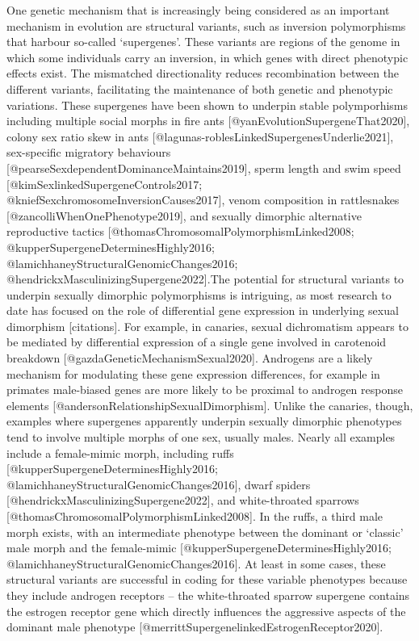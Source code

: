 \documentclass[
  11pt,
]{article}
\begin{document}
One genetic mechanism that is increasingly being considered as an important
mechanism in evolution are structural variants, such as inversion
polymorphisms that harbour so-called `supergenes'. These variants are
regions of the genome in which some individuals carry an inversion, in
which genes with direct phenotypic effects exist. The mismatched
directionality reduces recombination between the different variants,
facilitating the maintenance of both genetic and phenotypic variations.
These supergenes have been shown to underpin stable polymporhisms
including multiple social morphs in fire ants
{[}@yanEvolutionSupergeneThat2020{]}, colony sex ratio skew in ants
{[}@lagunas-roblesLinkedSupergenesUnderlie2021{]}, sex-specific migratory behaviours {[}@pearseSexdependentDominanceMaintains2019{]}, sperm length and swim speed {[}@kimSexlinkedSupergeneControls2017; @kniefSexchromosomeInversionCauses2017{]}, venom composition in rattlesnakes
{[}@zancolliWhenOnePhenotype2019{]}, and sexually dimorphic alternative
reproductive tactics {[}@thomasChromosomalPolymorphismLinked2008;
@kupperSupergeneDeterminesHighly2016;
@lamichhaneyStructuralGenomicChanges2016;
@hendrickxMasculinizingSupergene2022{]}.The potential for structural
variants to underpin sexually dimorphic polymorphisms is intriguing, as
most research to date has focused on the role of differential gene
expression in underlying sexual dimorphism {[}citations{]}. For example, in
canaries, sexual dichromatism appears to be mediated by differential
expression of a single gene involved in carotenoid breakdown
{[}@gazdaGeneticMechanismSexual2020{]}. Androgens are a likely mechanism
for modulating these gene expression differences, for example in
primates male-biased genes are more likely to be proximal to androgen
response elements {[}@andersonRelationshipSexualDimorphism{]}. Unlike the
canaries, though, examples where supergenes apparently underpin sexually
dimorphic phenotypes tend to involve multiple morphs of one sex, usually
males. Nearly all examples include a female-mimic morph, including ruffs
{[}@kupperSupergeneDeterminesHighly2016;
@lamichhaneyStructuralGenomicChanges2016{]}, dwarf spiders
{[}@hendrickxMasculinizingSupergene2022{]}, and white-throated sparrows
{[}@thomasChromosomalPolymorphismLinked2008{]}. In the ruffs, a third male
morph exists, with an intermediate phenotype between the dominant or
`classic' male morph and the female-mimic
{[}@kupperSupergeneDeterminesHighly2016;
@lamichhaneyStructuralGenomicChanges2016{]}. At least in some cases,
these structural variants are successful in coding for these variable
phenotypes because they include androgen receptors -- the white-throated
sparrow supergene contains the estrogen receptor gene which directly
influences the aggressive aspects of the dominant male phenotype
{[}@merrittSupergenelinkedEstrogenReceptor2020{]}.
\end{document}
